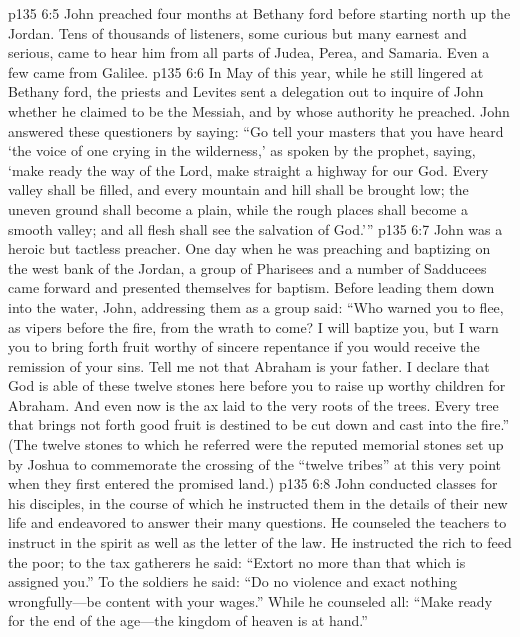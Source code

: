 \vs p135 6:5 John preached four months at Bethany ford before starting north up the Jordan. Tens of thousands of listeners, some curious but many earnest and serious, came to hear him from all parts of Judea, Perea, and Samaria. Even a few came from Galilee.\plusone
\vs p135 6:6 In May of this year, while he still lingered at Bethany ford, the priests and Levites sent a delegation out to inquire of John whether he claimed to be the Messiah, and by whose authority he preached. John answered these questioners by saying: “Go tell your masters that you have heard ‘the voice of one crying in the wilderness,’ as spoken by the prophet, saying, ‘make ready the way of the Lord, make straight a highway for our God. Every valley shall be filled, and every mountain and hill shall be brought low; the uneven ground shall become a plain, while the rough places shall become a smooth valley; and all flesh shall see the salvation of God.’”
\vs p135 6:7 John was a heroic but tactless preacher. One day when he was preaching and baptizing on the west bank of the Jordan, a group of Pharisees and a number of Sadducees came forward and presented themselves for baptism. Before leading them down into the water, John, addressing them as a group said: “Who warned you to flee, as vipers before the fire, from the wrath to come? I will baptize you, but I warn you to bring forth fruit worthy of sincere repentance if you would receive the remission of your sins. Tell me not that Abraham is your father. I declare that God is able of these twelve stones here before you to raise up worthy children for Abraham. And even now is the ax laid to the very roots of the trees. Every tree that brings not forth good fruit is destined to be cut down and cast into the fire.” (The twelve stones to which he referred were the reputed memorial stones set up by Joshua to commemorate the crossing of the “twelve tribes” at this very point when they first entered the promised land.)
\vs p135 6:8 John conducted classes for his disciples, in the course of which he instructed them in the details of their new life and endeavored to answer their many questions. He counseled the teachers to instruct in the spirit as well as the letter of the law. He instructed the rich to feed the poor; to the tax gatherers he said: “Extort no more than that which is assigned you.” To the soldiers he said: “Do no violence and exact nothing wrongfully---be content with your wages.” While he counseled all: “Make ready for the end of the age---the kingdom of heaven is at hand.”
